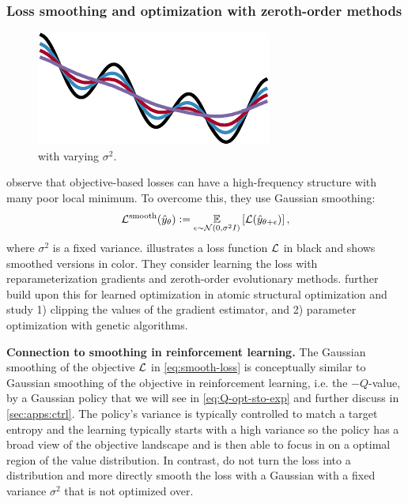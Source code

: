 \documentclass[twoside,11pt]{article}
\newcommand{\ie}{i.e.\xspace}
\begin{document}
\subsubsection{Loss smoothing and optimization with zeroth-order methods}
\label{sec:smooth}

\begin{figure}
\vspace{-2mm}
\includegraphics[width=\linewidth]{fig/smoothed-loss.pdf}
\caption{ with varying $\sigma^2$.}
\vspace{-1mm}
\label{fig:smooth-loss}
\end{figure}

\mbox{}\citet{metz2019understanding} observe that
objective-based losses can have a high-frequency
structure with many poor local minimum.
To overcome this, they use Gaussian smoothing:
\begin{equation}
  {\mathcal{L}}^{\rm smooth}(\hat y_\theta)\vcentcolon= \operatorname*{\mathbb{E}}_{\epsilon\sim{\mathcal{N}}(0,\sigma^2 I)}\left[{\mathcal{L}}(\hat y_{\theta+\epsilon})\right],
  \label{eq:smooth-loss}
\end{equation}
where $\sigma^2$ is a fixed variance.
 illustrates a loss function ${\mathcal{L}}$ in
black and shows smoothed versions in color.
They consider learning the loss with reparameterization
gradients and zeroth-order evolutionary methods.
\citet{merchant2021learn2hop} further
build upon this for learned optimization in
atomic structural optimization
and study 1)
clipping the values of the gradient estimator,
and 2) parameter optimization with genetic algorithms.

\textbf{Connection to smoothing in reinforcement learning.}
The Gaussian smoothing of the objective ${\mathcal{L}}$ in \cref{eq:smooth-loss}
is conceptually similar to Gaussian smoothing of the
objective in reinforcement learning, \ie the $-Q$-value,
by a Gaussian policy that we will see in
\cref{eq:Q-opt-sto-exp} and further discuss
in \cref{sec:apps:ctrl}.
The policy's variance is typically controlled to match a
target entropy \citet{haarnoja2018soft} and the learning
typically starts with a high variance so the policy has a
broad view of the objective landscape and is then able to focus in
on a optimal region of the value distribution.
In contrast, \citet{metz2019understanding,merchant2021learn2hop}
do not turn the loss into a distribution and more directly
smooth the loss with a Gaussian with a fixed variance $\sigma^2$
that is not optimized over.
\end{document}

